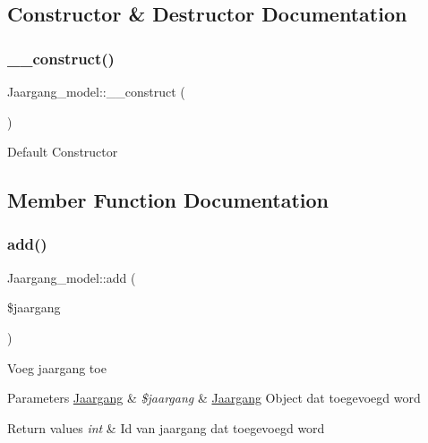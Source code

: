 \subsection{Constructor \& Destructor Documentation}
\mbox{\label{class_jaargang__model_a8556a042a80cea1a12445d8389c2e019}} 
\subsubsection{\texorpdfstring{\+\_\+\+\_\+construct()}{\_\_construct()}}
{\footnotesize\ttfamily Jaargang\+\_\+model\+::\+\_\+\+\_\+construct (\begin{DoxyParamCaption}{ }\end{DoxyParamCaption})}

Default Constructor 

\subsection{Member Function Documentation}
\mbox{\label{class_jaargang__model_a726ba676b9f198c0bf77191a66262421}} 
\subsubsection{\texorpdfstring{add()}{add()}}
{\footnotesize\ttfamily Jaargang\+\_\+model\+::add (\begin{DoxyParamCaption}\item[{}]{\$jaargang }\end{DoxyParamCaption})}

Voeg jaargang toe 
\begin{DoxyParams}[1]{Parameters}
\mbox{\hyperlink{class_jaargang}{Jaargang}} & {\em \$jaargang} & \mbox{\hyperlink{class_jaargang}{Jaargang}} Object dat toegevoegd word \\
\hline
\end{DoxyParams}

\begin{DoxyRetVals}{Return values}
{\em int} & Id van jaargang dat toegevoegd word \\
\hline
\end{DoxyRetVals}
\mbox{\label{class_jaargang__model_a56a8c0bc2beb0dca5ab28ca8d019d64e}} 
